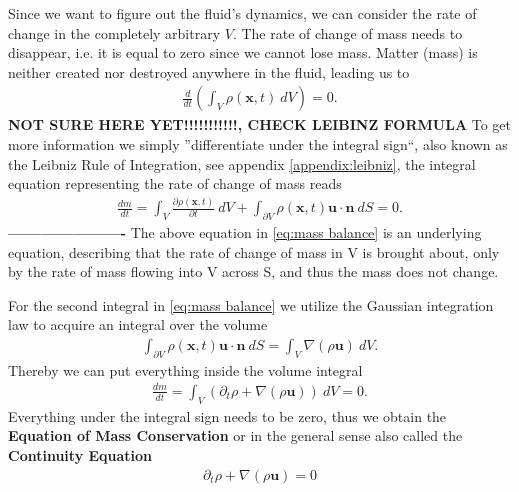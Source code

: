 Since we want to figure out the fluid's dynamics, we can consider the rate
of change in the completely arbitrary $V$. The rate of change of mass needs to
disappear, i.e. it is equal to zero since we cannot lose mass. Matter (mass) is
neither created nor destroyed anywhere in the fluid, leading us to
\begin{align}
    \frac{d}{dt}\left( \int_V \rho(\mathbf{x}, t)\ dV \right) = 0.
\end{align}
\textbf{NOT SURE HERE YET!!!!!!!!!!!, CHECK LEIBINZ FORMULA}
To get more information we simply ''differentiate under the integral
sign``, also known as the Leibniz Rule of Integration, see appendix
\ref{appendix:leibniz}, the integral equation representing the rate of change
of mass reads
\begin{align}\label{eq:mass balance}
    \frac{dm}{dt} = \int_V \frac{\partial \rho(\mathbf{x}, t)}{\partial t}\ dV
    +\int_{\partial V} \rho(\mathbf{x}, t) \mathbf{u}\cdot\mathbf{n}\ dS
    = 0.
\end{align}
\textbf{----------------------}
The above equation in \ref{eq:mass balance} is an underlying equation, describing that the rate of
change of mass in V is brought about, only by the rate of mass flowing into
V across S, and thus the mass does not change.

For the second integral in \ref{eq:mass balance} we utilize the Gaussian
integration law to acquire an integral over the volume
\begin{align}
    \int_{\partial V} \rho(\mathbf{x}, t) \mathbf{u} \cdot \mathbf{n} \ dS =
    \int_V \nabla (\rho \mathbf{u})\ dV.
\end{align}
Thereby we can put everything inside the volume integral
\begin{align}
    \frac{d m}{dt} = \int_V \left(\partial_t \rho + \nabla(\rho \mathbf{u}) \right) \ dV = 0.
\end{align}
Everything under the integral sign needs to be zero, thus we obtain
the \textbf{Equation of Mass Conservation} or in the general sense also
called the \textbf{Continuity Equation}
\begin{align}\label{eq:continuity}
    \partial_t \rho + \nabla(\rho \mathbf{u}) = 0
\end{align}


